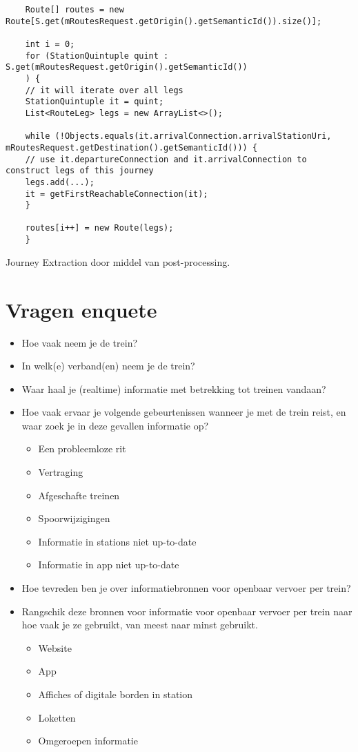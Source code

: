 \begin{appendices}
\begin{listing}[h]
	\begin{verbatim}
	Route[] routes = new Route[S.get(mRoutesRequest.getOrigin().getSemanticId()).size()];
	
	int i = 0;
	for (StationQuintuple quint : S.get(mRoutesRequest.getOrigin().getSemanticId())
	) {
	// it will iterate over all legs
	StationQuintuple it = quint;
	List<RouteLeg> legs = new ArrayList<>();
	
	while (!Objects.equals(it.arrivalConnection.arrivalStationUri, mRoutesRequest.getDestination().getSemanticId())) {
	// use it.departureConnection and it.arrivalConnection to construct legs of this journey
	legs.add(...);
	it = getFirstReachableConnection(it);
	}
	
	routes[i++] = new Route(legs);
	}
	\end{verbatim}
	\caption[CSA: Journey extraction]{Journey Extraction door middel van post-processing.}
	\label{code:2:csaJourneyExtraction}
\end{listing}	

\chapter{Vragen enquete}
\label{appendix:enquete}

\begin{itemize}
	
	
	\item Hoe vaak neem je de trein?
	\item In welk(e) verband(en) neem je de trein?
	\item Waar haal je (realtime) informatie met betrekking tot treinen vandaan?
	\item Hoe vaak ervaar je volgende gebeurtenissen wanneer je met de trein reist, en waar zoek je in deze gevallen informatie op?
	\begin{itemize}
		\item Een probleemloze rit
		\item Vertraging
		\item Afgeschafte treinen
		\item Spoorwijzigingen
		\item Informatie in stations niet up-to-date
		\item Informatie in app niet up-to-date
	\end{itemize}
	
	\item Hoe tevreden ben je over informatiebronnen voor openbaar vervoer per trein?
	\item Rangschik deze bronnen voor informatie voor openbaar vervoer per trein naar hoe vaak je ze gebruikt, van meest naar minst gebruikt.
	\begin{itemize}
		\item Website
		\item App
		\item Affiches of digitale borden in station
		\item Loketten
		\item Omgeroepen informatie
	\end{itemize}
	

\end{itemize}
\end{appendices}
